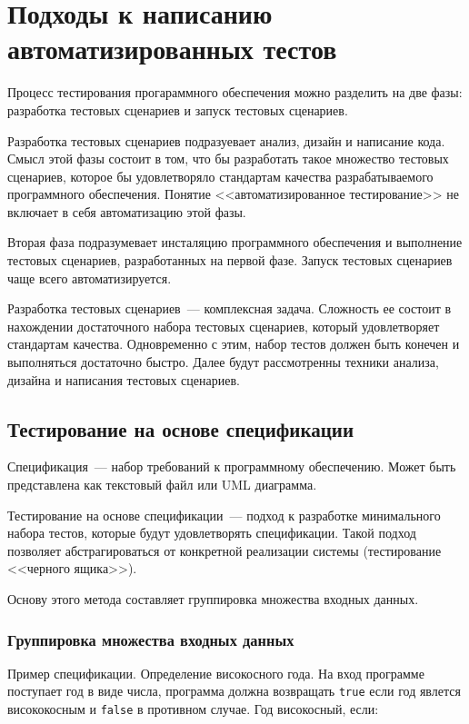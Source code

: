 \section{Подходы к написанию автоматизированных тестов} 

Процесс тестирования прогараммного обеспечения можно разделить на две фазы: разработка тестовых сценариев и запуск тестовых сценариев. 

Разработка тестовых сценариев подразуевает анализ, дизайн и написание кода. Смысл этой фазы состоит в том, что бы разработать такое множество тестовых сценариев, которое бы удовлетворяло стандартам качества разрабатываемого программного обеспечения. Понятие <<автоматизированное тестирование>> не включает в себя автоматизацию этой фазы.

Вторая фаза подразумевает инсталяцию программного обеспечения и выполнение тестовых сценариев, разработанных на первой фазе. Запуск тестовых сценариев чаще всего автоматизируется. 


Разработка тестовых сценариев~--- комплексная задача. Сложность ее состоит в нахождении достаточного набора тестовых сценариев, который удовлетворяет стандартам качества. Одновременно с этим, набор тестов должен быть конечен и выполняться достаточно быстро. Далее будут рассмотренны техники анализа, дизайна и написания тестовых сценариев.


\subsection{Тестирование на основе спецификации} 

Спецификация~--- набор требований к программному обеспечению. Может быть представлена как текстовый файл или UML диаграмма.

Тестирование на основе спецификации~--- подход к разработке минимального набора тестов, которые будут удовлетворять спецификации. Такой подход позволяет абстрагироваться от конкретной реализации системы (тестирование <<черного ящика>>).

Основу этого метода составляет группировка множества входных данных.

 \subsubsection{Группировка множества входных данных}

Пример спецификации. Определение високосного года. На вход программе поступает год в виде числа, программа должна возвращать \texttt{true} если год явлется висококосным и \texttt{false} в противном случае. Год високосный, если:

